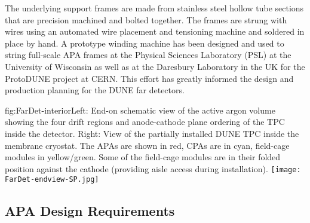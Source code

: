 The underlying support frames are made from stainless steel hollow tube sections that are precision machined and bolted together.  %
The frames are strung with wires using an automated wire placement and tensioning machine and soldered in place by hand.  A prototype winding machine has been designed and used to string full-scale APA frames at the Physical Sciences Laboratory (PSL) at the University of Wisconsin as well as at the Daresbury Laboratory in the UK for the ProtoDUNE project at CERN. This effort has greatly informed the design and production planning for the DUNE far detectors. %

\begin{dunefigure}{fig:FarDet-interior}{Left: End-on schematic view of the active argon volume showing the four drift regions and anode-cathode plane ordering of the TPC inside the detector. Right: View of the partially installed DUNE TPC inside the membrane cryostat. The APAs are shown in red, CPAs are in cyan, field-cage modules in yellow/green.  Some of the field-cage modules are in their folded position against the cathode (providing aisle access during installation).}
\setlength{\fboxsep}{0pt}
\setlength{\fboxrule}{0.5pt}
\texttt{[image: FarDet-endview-SP.jpg]}\hspace{0.05\textwidth}
\end{dunefigure}




\subsection{APA Design Requirements}
\label{sec:fdsp-apa-des-consid}


